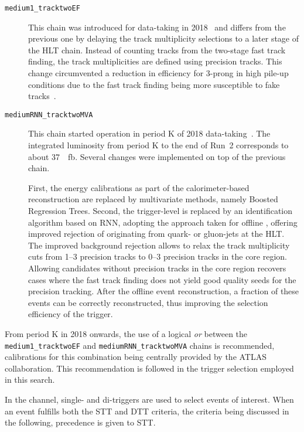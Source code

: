 \begin{description}
\item[\texttt{medium1\_tracktwoEF}]
  This chain was introduced for data-taking in
  2018~\cite{ATL-DAQ-PUB-2019-001} and differs from the previous one
  by delaying the track multiplicity selections to a later stage of
  the HLT chain. Instead of counting tracks from the two-stage fast
  track finding, the track multiplicities are defined using precision
  tracks. This change circumvented a reduction in efficiency for
  3-prong \tauhadvis in high pile-up conditions due to the fast track
  finding being more susceptible to fake
  tracks~\cite{ATL-DAQ-PUB-2019-001}.

\item[\texttt{mediumRNN\_tracktwoMVA}] This chain started operation in
  period K of 2018 data-taking~\cite{ATL-DAQ-PUB-2019-001}. The
  integrated luminosity from period K to the end of Run~2 corresponds
  to about \SI{37}{\per\femto\barn}. Several changes were implemented
  on top of the previous chain.

  First, the \tauhadvis energy calibrations as part of the
  calorimeter-based \tauhadvis reconstruction are replaced by
  multivariate methods, namely Boosted Regression Trees. Second, the
  trigger-level \tauid is replaced by an identification algorithm
  based on RNN, adopting the approach taken for offline \tauid,
  offering improved rejection of \tauhadvis originating from quark- or
  gluon-jets at the HLT. The improved background rejection allows to
  relax the track multiplicity cuts from 1--3 precision tracks to 0--3
  precision tracks in the core region. Allowing \tauhadvis candidates
  without precision tracks in the core region recovers cases where the
  fast track finding does not yield good quality seeds for the
  precision tracking.  After the offline event reconstruction, a
  fraction of these events can be correctly reconstructed, thus
  improving the selection efficiency of the trigger.
\end{description}
From period K in 2018 onwards, the use of a logical \emph{or} between
the \texttt{medium1\_tracktwoEF} and \texttt{mediumRNN\_tracktwoMVA}
chains is recommended, calibrations for this combination being
centrally provided by the ATLAS collaboration. This recommendation is
followed in the trigger selection employed in this search.

In the \hadhad channel, single- and di-\tauhadvis triggers are used to
select events of interest. When an event fulfills both the STT and DTT
criteria, the criteria being discussed in the following, precedence is
given to STT.

